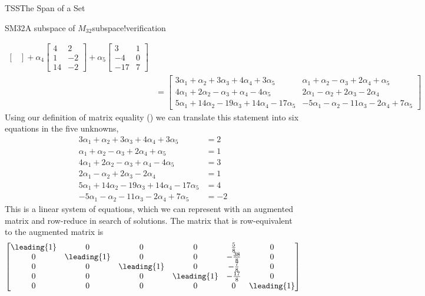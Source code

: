\begin{subsect}{TSS}{The Span of a Set}
\begin{example}{SM32}{A subspace of $M_{32}$}{subspace!verification}
\begin{para}
\begin{align*}
\begin{bmatrix}
\end{bmatrix}
+\alpha_4
\begin{bmatrix}
4 & 2 \\ 1 & -2 \\ 14 & -2
\end{bmatrix}
+\alpha_5
\begin{bmatrix}
3 & 1 \\ -4 & 0 \\ -17 & 7
\end{bmatrix}\\
%
&=
\begin{bmatrix}
3\alpha_1 +\alpha_2 +3\alpha_3 +4\alpha_4 +3\alpha_5 &
\alpha_1 +\alpha_2 -\alpha_3 +2\alpha_4 +\alpha_5\\
4\alpha_1 +2\alpha_2 -\alpha_3 +\alpha_4 -4\alpha_5&
2\alpha_1 -\alpha_2 +2\alpha_3 -2\alpha_4 \\
5\alpha_1 +14\alpha_2 -19\alpha_3 +14\alpha_4 -17\alpha_5&
-5\alpha_1 -\alpha_2 -11\alpha_3 -2\alpha_4 +7\alpha_5
\end{bmatrix}
\end{align*}
%
Using our definition of matrix equality () we can translate this statement into six equations in the five unknowns,
%
\begin{align*}
3\alpha_1 +\alpha_2 +3\alpha_3 +4\alpha_4 +3\alpha_5& =2\\
\alpha_1 +\alpha_2 -\alpha_3 +2\alpha_4 +\alpha_5& =1\\
4\alpha_1 +2\alpha_2 -\alpha_3 +\alpha_4 -4\alpha_5& =3\\
2\alpha_1 -\alpha_2 +2\alpha_3 -2\alpha_4 & =1\\
5\alpha_1 +14\alpha_2 -19\alpha_3 +14\alpha_4 -17\alpha_5& =4\\
-5\alpha_1 -\alpha_2 -11\alpha_3 -2\alpha_4 +7\alpha_5&=-2
\end{align*}
%
This is a linear system of equations, which we can represent with an augmented matrix and row-reduce in search of solutions.  The matrix that is row-equivalent to the augmented matrix is
%
\begin{equation*}
\begin{bmatrix}
\leading{1} & 0 & 0 & 0 & \frac{5}{8} & 0\\
0 & \leading{1} & 0 & 0 & -\frac{38}{8} & 0\\
0 & 0 & \leading{1} & 0 & -\frac{7}{8} & 0\\
0 & 0 & 0 & \leading{1} & -\frac{17}{8} & 0\\
0 & 0 & 0 & 0 & 0 & \leading{1}\\

\end{bmatrix}
\end{equation*}
\end{para}
\end{example}
\end{subsect}
